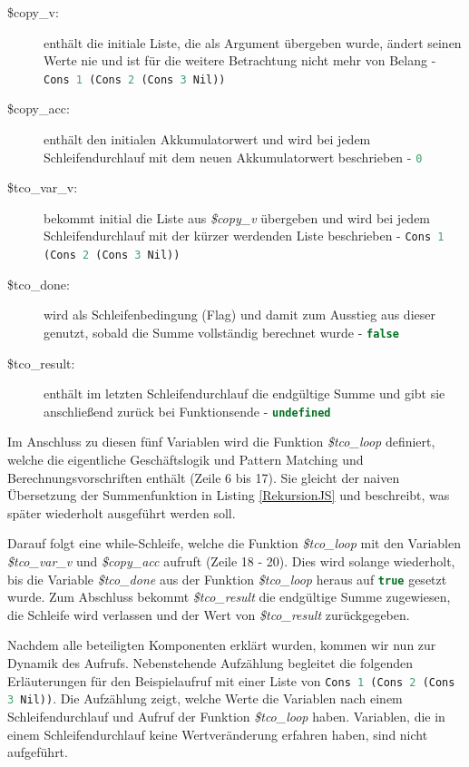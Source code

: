 \documentclass[
12pt,
ngerman,
oneside]
{scrbook} %
\begin{document}
\begin{description}
	\item[\$copy_v:]  enthält die initiale Liste, die als Argument übergeben wurde, ändert seinen Werte nie und ist für die weitere Betrachtung nicht mehr von Belang - \lstinline[language=javascript, columns=fixed]{Cons 1 (Cons 2 (Cons 3 Nil))}
	\item[\$copy_acc:] enthält den initialen Akkumulatorwert und wird bei jedem Schleifendurchlauf mit dem neuen Akkumulatorwert beschrieben - \lstinline[language=javascript, columns=fixed]{0}
	\item[\$tco_var_v:] bekommt initial die Liste aus \emph{\$copy_v} übergeben und wird bei jedem Schleifendurchlauf mit der kürzer werdenden Liste beschrieben - \lstinline[language=javascript, columns=fixed]{Cons 1 (Cons 2 (Cons 3 Nil))}
	\item[\$tco_done:] wird als Schleifenbedingung (Flag) und damit zum Ausstieg aus dieser genutzt, sobald die Summe vollständig berechnet wurde - \lstinline[language=javascript, columns=fixed]{false}
	\item[\$tco_result:] enthält im letzten Schleifendurchlauf die endgültige Summe und gibt sie anschließend zurück bei Funktionsende - \lstinline[language=javascript, columns=fixed]{undefined}
\end{description}

Im Anschluss zu diesen fünf Variablen wird die Funktion \emph{\$tco_loop} definiert, welche die eigentliche Geschäftslogik und Pattern Matching und Berechnungsvorschriften enthält (Zeile 6 bis 17). Sie gleicht der naiven Übersetzung der Summenfunktion in Listing \ref{RekursionJS} und beschreibt, was später wiederholt ausgeführt werden soll.

Darauf folgt eine while-Schleife, welche die Funktion \emph{\$tco_loop} mit den Variablen \emph{\$tco_var_v} und \emph{\$copy_acc} aufruft (Zeile 18 - 20). Dies wird solange wiederholt, bis die Variable \emph{\$tco_done} aus der Funktion \emph{\$tco_loop} heraus auf \lstinline[language=javascript, columns=fixed]{true} gesetzt wurde. Zum Abschluss bekommt \emph{\$tco_result} die endgültige Summe zugewiesen, die Schleife wird verlassen und der Wert von \emph{\$tco_result} zurückgegeben.

Nachdem alle beteiligten Komponenten erklärt wurden, kommen wir nun zur Dynamik des Aufrufs. Nebenstehende Aufzählung begleitet die folgenden Erläuterungen für den Beispielaufruf mit einer Liste von \lstinline[language=javascript, columns=fixed]{Cons 1 (Cons 2 (Cons 3 Nil))}. Die Aufzählung zeigt, welche Werte die Variablen nach einem Schleifendurchlauf und Aufruf der Funktion \emph{\$tco_loop} haben. Variablen, die in einem Schleifendurchlauf keine Wertveränderung erfahren haben, sind nicht aufgeführt.
\end{document}

